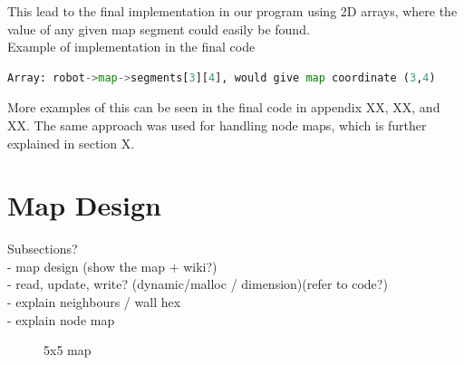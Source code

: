 This lead to the final implementation in our program using 2D arrays, 
where the value of any given map segment could easily be found. 
\\
Example of implementation in the final code
\begin{lstlisting}[language=Python]
Array: robot->map->segments[3][4], would give map coordinate (3,4)
\end{lstlisting}
More examples of this can be seen in the final code in appendix XX, XX, and XX. 
The same approach was used for handling node maps, which is further explained in section X.

\section{Map Design}
\label{sec:map_design} %


Subsections?\\
- map design (show the map + wiki?)\\
- read, update, write? (dynamic/malloc / dimension)(refer to code?)\\
- explain neighbours / wall hex\\
- explain node map\\


\begin{figure}[htp]
    \centering
    \hspace{0.2\textwidth}
    \caption{5x5 map}
    \label{fig:5x5map}
\end{figure}

